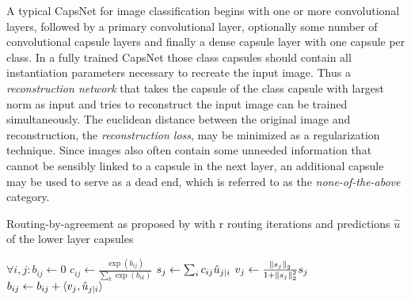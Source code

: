 A typical CapsNet for image classification begins with one or more convolutional layers, followed by a primary convolutional layer, optionally some number of convolutional capsule layers and finally a dense capsule layer with one capsule per class.
In a fully trained CapsNet those class capsules should contain all instantiation parameters necessary to recreate the input image.
Thus a \emph{reconstruction network} that takes the capsule of the class capsule with largest norm as input and tries to reconstruct the input image can be trained simultaneously.
The euclidean distance between the original image and reconstruction, the \emph{reconstruction loss}, may be minimized as a regularization technique.
Since images also often contain some unneeded information that cannot be sensibly linked to a capsule in the next layer, an additional capsule may be used to serve as a dead end, which is referred to as the \emph{none-of-the-above} category.

\begin{algorithm}
\caption[Routing-by-agreement]{Routing-by-agreement as proposed by \citet{capsules} with r routing iterations and predictions $\hat{u}$ of the lower layer capsules}
\label{alg:routing}
\begin{algorithmic}[1]
	
	\State $\forall i,j: b_{ij} \gets 0$
		\State $c_{ij} \gets \frac{\exp(b_{ij})}{\sum_{k}{\exp(b_{ik})}}$ 
		\State $s_j \gets \sum_{i}{c_{ij}\hat{u}_{j \vert i}}$
		\State $v_j \gets \frac{\left \lVert s_j \right \rVert _{2}}{1 + \left \lVert s_j \right \rVert _{2}^2} s_j$ 
		\State $b_{ij} \gets b_{ij} + \langle v_j, \hat{u}_{j \vert i} \rangle$	
	\EndFor
\EndProcedure
	
\end{algorithmic}
\end{algorithm}
